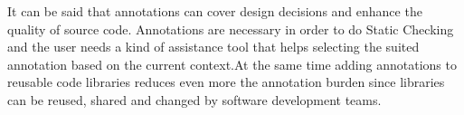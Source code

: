 It can be said that annotations can cover design decisions and enhance the quality of source code. Annotations are necessary in order to do Static Checking and the user needs a kind of assistance tool that helps selecting the suited annotation based on the current context.At the same time adding annotations to reusable code libraries reduces even more the annotation burden since libraries can be reused, shared and changed by software development teams.\\

 

 


